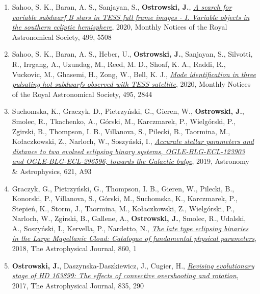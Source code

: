 \documentclass[margin, 10pt]{res} %
\begin{document}
\begin{resume}
\begin{enumerate}
    \item Sahoo, S. K., Baran, A. S., Sanjayan, S., \textbf{Ostrowski, J.}, \href{https://ui.adsabs.harvard.edu/abs/2020MNRAS.499.5508S/abstract}{\textit{A search for variable subdwarf B stars in TESS full frame images - I. Variable objects in the southern ecliptic hemisphere}}, 2020, Monthly Notices of the Royal Astronomical Society, 499, 5508

    \item Sahoo, S. K., Baran, A. S., Heber, U., \textbf{Ostrowski, J.}, Sanjayan, S., Silvotti, R., Irrgang, A., Uzundag, M., Reed, M. D., Shoaf, K. A., Raddi, R., Vuckovic, M., Ghasemi, H., Zong, W., Bell, K. J., \href{https://ui.adsabs.harvard.edu/abs/2020MNRAS.495.2844S/abstract}{\textit{Mode identification in three pulsating hot subdwarfs observed with TESS satellite}}, 2020, Monthly Notices of the Royal Astronomical Society, 495, 2844

    \item Suchomska, K., Graczyk, D., Pietrzyński, G., Gieren, W., \textbf{Ostrowski, J.}, Smolec, R., Tkachenko, A., Górski, M., Karczmarek, P., Wielgórski, P., Zgirski, B., Thompson, I. B., Villanova, S., Pilecki, B., Taormina, M., Kołaczkowski, Z., Narloch, W., Soszyński, I., \href{https://ui.adsabs.harvard.edu/abs/2019A%26A...621A..93S/abstract}{\textit{Accurate stellar parameters and distance to two evolved eclipsing binary systems, OGLE-BLG-ECL-123903 and OGLE-BLG-ECL-296596, towards the Galactic bulge}}, 2019, Astronomy \& Astrophysics, 621, A93

    \item Graczyk, G., Pietrzy\'{n}ski, G., Thompson, I. B., Gieren, W., Pilecki, B., Konorski, P., Villanova, S., G\'{o}rski, M., Suchomska, K., Karczmarek, P., Stepie\'{n}, K., Storm, J., Taormina, M., Ko\l{}aczkowski, Z., Wielg\'{o}rski, P., Narloch, W., Zgirski, B., Gallene, A., \textbf{Ostrowski, J.}, Smolec, R., Udalski, A., Soszy\'{n}ski, I., Kervella, P., Nardetto, N., \href{https://ui.adsabs.harvard.edu/abs/2018ApJ...860....1G/abstract}{\textit{The late type eclipsing binaries in the Large Magellanic Cloud: Catalogue of fundamental physical parameters}}, 2018, The Astrophysical Journal, 860, 1

    \item \textbf{Ostrowski, J.}, Daszynska-Daszkiewicz, J., Cugier, H., \href{http://adsabs.harvard.edu/abs/2017ApJ...835..290O}{\textit{Revising  evolutionary stage of HD 163899: The effects of convective overshooting and rotation}}, 2017, The Astrophysical Journal, 835, 290


\end{enumerate}
\end{resume}
\end{document}

